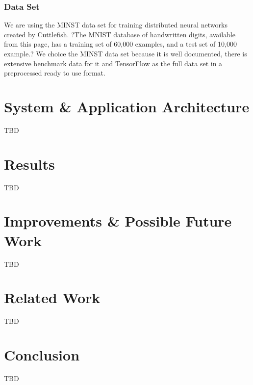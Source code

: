 \documentclass[conference]{IEEEtran}
\begin{document}
\subsubsection{Data Set}
We are using the MINST data set for training distributed neural networks created by Cuttlefish. ?The MNIST database of handwritten digits, available from this page, has a training set of 60,000 examples, and a test set of 10,000 example.? \cite{mnist-doc} We choice the MINST data set because it is well documented, there is extensive benchmark data for it and TensorFlow as the full data set in a preprocessed ready to use format.


\section{System \& Application Architecture}
TBD

\section{Results}
TBD

\section{Improvements \& Possible Future Work}
TBD

\section{Related Work}
TBD


\section{Conclusion}
TBD




\end{document}
